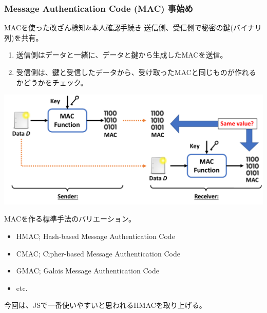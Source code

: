 \documentclass[12pt,dvipdfmx]{beamer}
\begin{document}
\begin{frame}
\frametitle{Message Authentication Code (MAC) 事始め}
\begin{block}{\small MACを使った改ざん検知\&本人確認手続き}
\small
送信側、受信側で秘密の鍵(バイナリ列)を共有。
\begin{enumerate}
\item 送信側はデータと一緒に、データと鍵から生成したMACを送信。
\item 受信側は、鍵と受信したデータから、受け取ったMACと同じものが作れるかどうかをチェック。
\end{enumerate}
\end{block}

\begin{center}
\includegraphics[width=0.9\linewidth]{Figs/mac-flow02.pdf}
\end{center}
\end{frame}

\begin{frame}
MACを作る標準手法のバリエーション。 
\begin{itemize} 
 \item \alert{HMAC; Hash-based Message Authentication Code}
 \item CMAC; Cipher-based Message Authentication Code
 \item GMAC; Galois Message Authentication Code
 \item etc.
\end{itemize}
今回は、JSで一番使いやすいと思われるHMACを取り上げる。
\end{frame}
\end{document}

